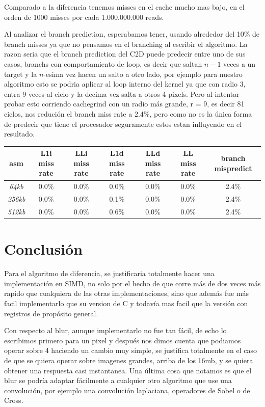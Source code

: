 \documentclass[a4paper]{article}
\begin{document}
Comparado a la diferencia tenemos misses en el cache mucho mas bajo, en el orden de 1000 misses por cada 1.000.000.000 reads. 

Al analizar el branch prediction, esperabamos tener, usando alrededor del 10\% de branch misses ya que no pensamos en el branching al escribir el algoritmo. La razon seria que el branch prediction del C2D puede predecir entre uno de sus casos, branchs con comportamiento de loop, es decir que saltan $n-1$ veces a un target y la $n$-esima vez hacen un salto a otro lado, por ejemplo para nuestro algoritmo esto se podria aplicar al loop interno del kernel ya que con radio 3, entra 9 veces al ciclo y la decima vez salta a otros 4 pixels. Pero al intentar probar esto corriendo cachegrind con un radio más grande, r = $9$, es decir 81 ciclos, nos redución el branch miss rate a 2.4\%, pero como no es la única forma de predecir que tiene el procesador seguramente estos estan influyendo en el resultado.

\begin{center}
    	\begin{tabular}[c]{|c|c|c|c|c|c|c|}
    \hline
        \textbf{asm} &  \textbf{L1i miss rate} & \textbf{LLi miss rate} & \textbf{L1d miss rate} & \textbf{LLd miss rate} & \textbf{LL miss rate} & \textbf{branch mispredict}\\
        \hline
\textit{64kb} &    0.0\%  & 0.0\% & 0.0\% & 0.0\% & 0.0\% & 2.4\% \\
        \hline
\textit{256kb} &   0.0\%  & 0.0\% & 0.1\% & 0.0\% & 0.0\% & 2.4\%\\
        \hline
\textit{512kb} &  0.0\%  & 0.0\% & 0.6\% & 0.0\% & 0.0\% & 2.4\% \\
        \hline
    \end{tabular}
\end{center}

\newpage 

\section{Conclusión}

 Para el algoritmo de diferencia, se justificaria totalmente hacer una implementación en SIMD, no solo por el hecho de que corre más de dos veces más rapido que cualquiera de las otras implementaciones, sino que además fue más facil implementarlo que su version de C y todavía mas facil que la versión con registros de propósito general. 
 
 Con respecto al blur, aunque implementarlo no fue tan fácil, de echo lo escribimos primero para un pixel y después nos dimos cuenta que podiamos operar sobre 4 haciendo un cambio muy simple, se justifica totalmente en el caso de que se quiera operar sobre imagenes grandes, arriba de los 16mb, y se quiera obtener una respuesta casi instantanea. Una última cosa que notamos es que el blur se podría adaptar fácilmente a cualquier otro algoritmo que use una convolución, por ejemplo una convolución laplaciana, operadores de Sobel o de Cross.

%



\nocite{*}
\end{document}

